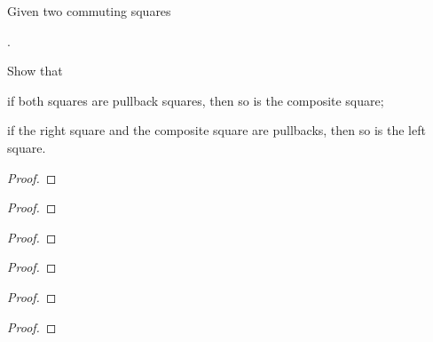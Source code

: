 \begin{exercise}{26}
    Given two commuting squares
    \begin{center}
        .
    \end{center}
    Show that
    \begin{exercises}
        \item if both squares are pullback squares, then so is the composite square;
        \item if the right square and the composite square are pullbacks, then so is the left square.
    \end{exercises}

\end{exercise}
\begin{solution}
    \begin{exercises}
        \item\begin{proof}
            
        \end{proof}
        \item\begin{proof}
            
        \end{proof}
    \end{exercises}
\end{solution}

\begin{exercise}{27}
    
\end{exercise}
\begin{solution}
    \begin{proof}
        
    \end{proof}
\end{solution}

\begin{exercise}{28}
    
\end{exercise}
\begin{solution}
    \begin{proof}
        
    \end{proof}
\end{solution}

\begin{exercise}{29}
    
\end{exercise}
\begin{solution}
    \begin{proof}
        
    \end{proof}
\end{solution}

\begin{exercise}{30}
    
\end{exercise}
\begin{solution}
    \begin{proof}
        
    \end{proof}
\end{solution}